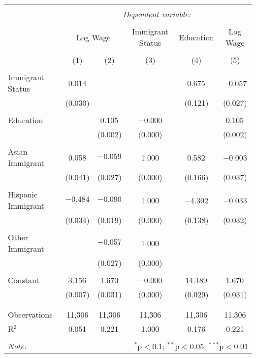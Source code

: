 \documentclass{article}
\begin{document}
\begin{table}[!htbp] \centering 
  \caption{} 
  \label{} 
\begin{tabular}{@{\extracolsep{5pt}}lccccc} 
\\[-1.8ex]\hline 
\hline \\[-1.8ex] 
 & \multicolumn{5}{c}{\textit{Dependent variable:}} \\ 
\cline{2-6} 
\\[-1.8ex] & \multicolumn{2}{c}{Log Wage} & Immigrant Status & Education & Log Wage \\ 
\\[-1.8ex] & (1) & (2) & (3) & (4) & (5)\\ 
\hline \\[-1.8ex] 
 Immigrant Status & 0.014 &  &  & 0.675$^{}$ & $-$0.057$^{}$ \\ 
  & (0.030) &  &  & (0.121) & (0.027) \\ 
  & & & & & \\ 
 Education &  & 0.105$^{}$ & $-$0.000$^{}$ &  & 0.105$^{}$ \\ 
  &  & (0.002) & (0.000) &  & (0.002) \\ 
  & & & & & \\ 
 Asian Immigrant & 0.058 & $-$0.059$^{}$ & 1.000$^{}$ & 0.582$^{}$ & $-$0.003 \\ 
  & (0.041) & (0.027) & (0.000) & (0.166) & (0.037) \\ 
  & & & & & \\ 
 Hispanic Immigrant & $-$0.484$^{}$ & $-$0.090$^{}$ & 1.000$^{}$ & $-$4.302$^{}$ & $-$0.033 \\ 
  & (0.034) & (0.019) & (0.000) & (0.138) & (0.032) \\ 
  & & & & & \\ 
 Other Immigrant &  & $-$0.057$^{}$ & 1.000$^{}$ &  &  \\ 
  &  & (0.027) & (0.000) &  &  \\ 
  & & & & & \\ 
 Constant & 3.156$^{}$ & 1.670$^{}$ & $-$0.000$^{}$ & 14.189$^{}$ & 1.670$^{}$ \\ 
  & (0.007) & (0.031) & (0.000) & (0.029) & (0.031) \\ 
  & & & & & \\ 
\hline \\[-1.8ex] 
Observations & 11,306 & 11,306 & 11,306 & 11,306 & 11,306 \\ 
R$^{2}$ & 0.051 & 0.221 & 1.000 & 0.176 & 0.221 \\ 
\hline 
\hline \\[-1.8ex] 
\textit{Note:}  & \multicolumn{5}{r}{$^{*}$p$<$0.1; $^{**}$p$<$0.05; $^{***}$p$<$0.01} \\ 
\end{tabular} 
\end{table} 
\end{document}
